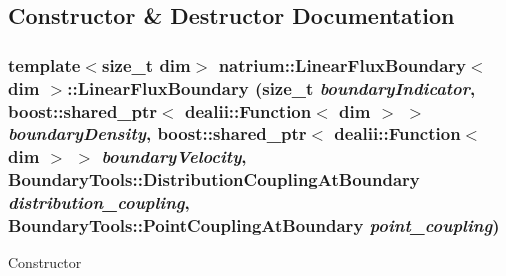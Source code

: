 \subsection{Constructor \& Destructor Documentation}
\hypertarget{classnatrium_1_1LinearFluxBoundary_a11da5c0871a45ec24aa7fa2d0e3843d9}{
\subsubsection[{LinearFluxBoundary}]{\setlength{\rightskip}{0pt plus 5cm}template$<$size\_\-t dim$>$ {\bf natrium::LinearFluxBoundary}$<$ dim $>$::{\bf LinearFluxBoundary} (size\_\-t {\em boundaryIndicator}, \/  boost::shared\_\-ptr$<$ dealii::Function$<$ dim $>$ $>$ {\em boundaryDensity}, \/  boost::shared\_\-ptr$<$ dealii::Function$<$ dim $>$ $>$ {\em boundaryVelocity}, \/  BoundaryTools::DistributionCouplingAtBoundary {\em distribution\_\-coupling}, \/  BoundaryTools::PointCouplingAtBoundary {\em point\_\-coupling})}}
\label{classnatrium_1_1LinearFluxBoundary_a11da5c0871a45ec24aa7fa2d0e3843d9}
Constructor 
